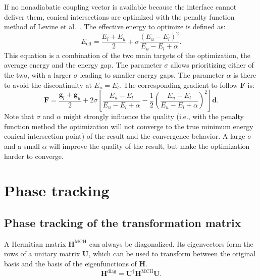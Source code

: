 \documentclass[a4paper,10pt,DIV=15,openany,twoside=false]{scrbook}
\newcommand{\VEC}[1]{\ensuremath{\mathbf{#1}}}
\begin{document}
If no nonadiabatic coupling vector is available because the interface cannot deliver them, conical intersections are optimized with the penalty function method of Levine et al.~\cite{Levine2008JPCB}.
The effective energy to optimize is defined as:
\begin{equation}
  E_\text{eff}=
  \frac{E_l+E_u}{2}
  +\sigma\frac{(E_u-E_l)^2}{E_u-E_l+\alpha}.
\end{equation}
This equation is a combination of the two main targets of the optimization, the average energy and the energy gap. 
The parameter $\sigma$ allows prioritizing either of the two, with a larger $\sigma$ leading to smaller energy gaps.
The parameter $\alpha$ is there to avoid the discontinuity at $E_u=E_l$.
The corresponding gradient to follow $\VEC{F}$ is:
\begin{equation}
  \VEC{F}=
  \frac{\VEC{g}_l+\VEC{g}_u}{2}
  +
  2\sigma\left[\frac{E_u-E_l}{E_u-E_l+\alpha}-\frac{1}{2}\left(\frac{E_u-E_l}{E_u-E_l+\alpha}\right)^2\right]\VEC{d}.
\end{equation}
Note that $\sigma$ and $\alpha$ might strongly influence the quality (i.e., with the penalty function method the optimization will not converge to the true minimum energy conical intersection point) of the result and the convergence behavior.
A large $\sigma$ and a small $\alpha$ will improve the quality of the result, but make the optimization harder to converge.



\section{Phase tracking}

\subsection{Phase tracking of the transformation matrix}\label{met:phase_track}

A Hermitian matrix $\VEC{H}^{\text{MCH}}$ can always be diagonalized. Its eigenvectors form the rows of a unitary matrix $\VEC{U}$, which can be used to transform between the original basis and the basis of the eigenfunctions of $\VEC{H}$. 
\begin{equation}
  \VEC{H}^{\text{diag}}=\VEC{U}^\dagger\VEC{H}^{\text{MCH}}\VEC{U}.
\end{equation}
\end{document}
